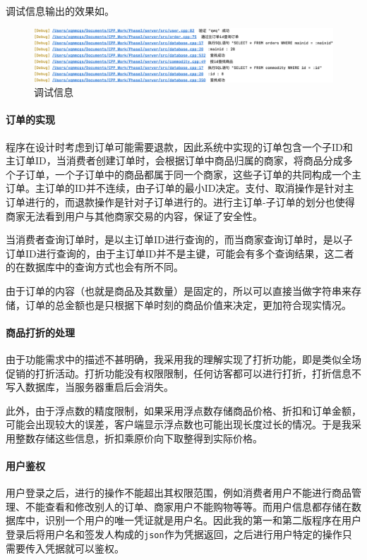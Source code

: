\documentclass[lang=cn,11pt,a4paper,cite=authornum]{paper}
\begin{document}
调试信息输出的效果如。

\begin{figure}[htbp]
    \centering
    \includegraphics[width=\linewidth]{./Images/debug.png}
    \caption{调试信息\label{fig:debug}}
\end{figure}

\paragraph{订单的实现} 程序在设计时考虑到订单可能需要退款，因此系统中实现的订单包含一个子ID和主订单ID，当消费者创建订单时，会根据订单中商品归属的商家，将商品分成多个子订单，一个子订单中的商品都属于同一个商家，这些子订单的共同构成一个主订单。主订单的ID并不连续，由子订单的最小ID决定。支付、取消操作是针对主订单进行的，而退款操作是针对子订单进行的。进行主订单-子订单的划分也使得商家无法看到用户与其他商家交易的内容，保证了安全性。

当消费者查询订单时，是以主订单ID进行查询的，而当商家查询订单时，是以子订单ID进行查询的，由于主订单ID并不是主键，可能会有多个查询结果，这二者的在数据库中的查询方式也会有所不同。

由于订单的内容（也就是商品及其数量）是固定的，所以可以直接当做字符串来存储，订单的总金额也是只根据下单时刻的商品价值来决定，更加符合现实情况。

\paragraph{商品打折的处理} 由于功能需求中的描述不甚明确，我采用我的理解实现了打折功能，即是类似全场促销的打折活动。打折功能没有权限限制，任何访客都可以进行打折，打折信息不写入数据库，当服务器重启后会消失。

此外，由于浮点数的精度限制，如果采用浮点数存储商品价格、折扣和订单金额，可能会出现较大的误差，客户端显示浮点数也可能出现长度过长的情况。于是我采用整数存储这些信息，折扣乘原价向下取整得到实际价格。

\paragraph{用户鉴权} 用户登录之后，进行的操作不能超出其权限范围，例如消费者用户不能进行商品管理、不能查看和修改别人的订单、商家用户不能购物等等。而用户信息都存储在数据库中，识别一个用户的唯一凭证就是用户名。因此我的第一和第二版程序在用户登录后将用户名和签发人构成的\texttt{json}作为凭据返回，之后进行用户特定的操作只需要传入凭据就可以鉴权。
\end{document}
